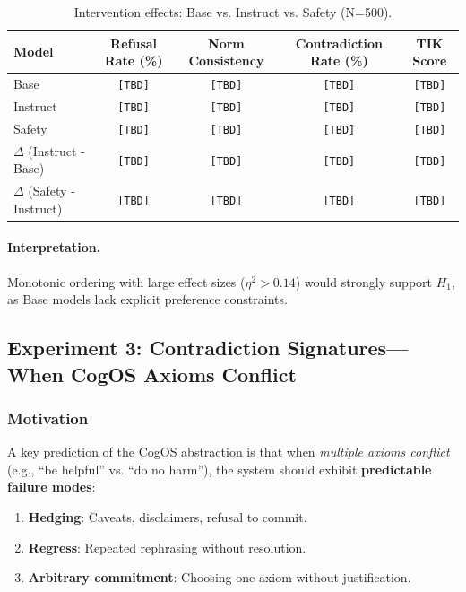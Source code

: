 \documentclass[11pt]{article}
\begin{document}
\begin{table}[h]
\centering
\caption{Intervention effects: Base vs. Instruct vs. Safety (N=500).}
\label{tab:intervention-results}
\begin{tabular}{lcccc}
\toprule
Model & Refusal Rate (\%) & Norm Consistency & Contradiction Rate (\%) & TIK Score \\
\midrule
Base & \texttt{[TBD]} & \texttt{[TBD]} & \texttt{[TBD]} & \texttt{[TBD]} \\
Instruct & \texttt{[TBD]} & \texttt{[TBD]} & \texttt{[TBD]} & \texttt{[TBD]} \\
Safety & \texttt{[TBD]} & \texttt{[TBD]} & \texttt{[TBD]} & \texttt{[TBD]} \\
\midrule
$\Delta$ (Instruct - Base) & \texttt{[TBD]} & \texttt{[TBD]} & \texttt{[TBD]} & \texttt{[TBD]} \\
$\Delta$ (Safety - Instruct) & \texttt{[TBD]} & \texttt{[TBD]} & \texttt{[TBD]} & \texttt{[TBD]} \\
\bottomrule
\end{tabular}
\end{table}

\paragraph{Interpretation.} Monotonic ordering with large effect sizes ($\eta^2 > 0.14$) would strongly support $H_1$, as Base models lack explicit preference constraints.

\subsection{Experiment 3: Contradiction Signatures—When CogOS Axioms Conflict}

\subsubsection{Motivation}

A key prediction of the CogOS abstraction is that when \emph{multiple axioms conflict} (e.g., ``be helpful'' vs. ``do no harm''), the system should exhibit \textbf{predictable failure modes}:
\begin{enumerate}
    \item \textbf{Hedging}: Caveats, disclaimers, refusal to commit.
    \item \textbf{Regress}: Repeated rephrasing without resolution.
    \item \textbf{Arbitrary commitment}: Choosing one axiom without justification.
\end{enumerate}
\end{document}
